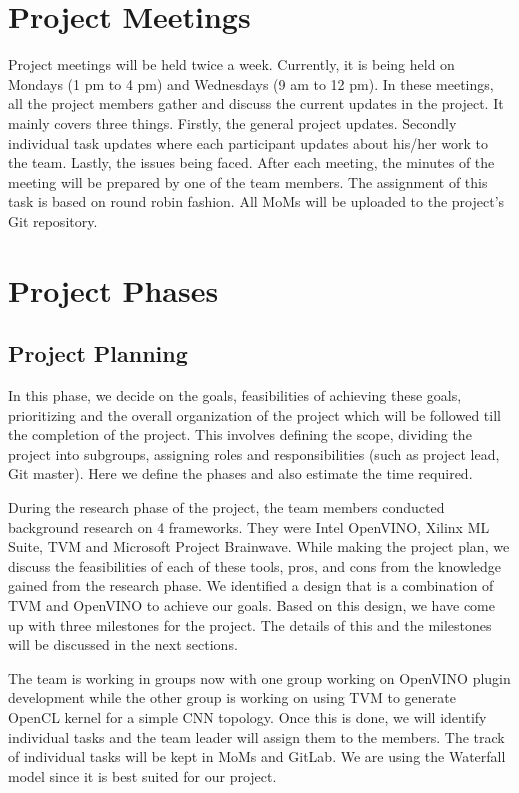 \documentclass[titlepage]{report}
\begin{document}
\section{Project Meetings}
Project meetings will be held twice a week. Currently, it is being held on Mondays (1 pm to 4 pm) and Wednesdays (9 am to 12 pm). In these meetings, all the project members gather and discuss the current updates in the project. It mainly covers three things. Firstly, the general project updates. Secondly individual task updates where each participant updates about his/her work to the team. Lastly, the issues being faced. 
After each meeting, the minutes of the meeting will be prepared by one of the team members. The assignment of this task is based on round robin fashion. All MoMs will be uploaded to the project’s Git repository.


\section{Project Phases}
\subsection{Project Planning}
In this phase, we decide on the goals, feasibilities of achieving these goals, prioritizing and the overall organization of the project which will be followed till the completion of the project. This involves defining the scope, dividing the project into subgroups, assigning roles and responsibilities (such as project lead, Git master). Here we define the phases and also estimate the time required. 

During the research phase of the project, the team members conducted background research on 4 frameworks. They were Intel OpenVINO, Xilinx ML Suite, TVM and Microsoft Project Brainwave. While making the project plan, we discuss the feasibilities of each of these tools, pros, and cons from the knowledge gained from the research phase. We identified a design that is a combination of TVM and OpenVINO to achieve our goals. Based on this design, we have come up with three milestones for the project. The details of this and the milestones will be discussed in the next sections. 

The team is working in groups now with one group working on OpenVINO plugin development while the other group is working on using TVM to generate OpenCL kernel for a simple CNN topology. Once this is done, we will identify individual tasks and the team leader will assign them to the members. The track of individual tasks will be kept in MoMs and GitLab. We are using the Waterfall model since it is best suited for our project. 
\end{document}
